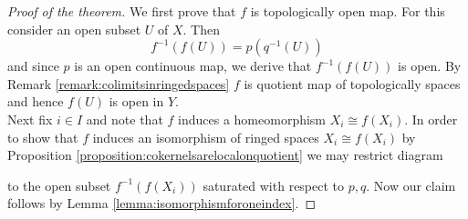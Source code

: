 \begin{proof}[Proof of the theorem]
We first prove that $f$ is topologically open map. For this consider an open subset $U$ of $X$. Then
$$f^{-1}(f(U)) = p(q^{-1}(U))$$
and since $p$ is an open continuous map, we derive that $f^{-1}(f(U))$ is open. By Remark \ref{remark:colimitsinringedspaces} $f$ is quotient map of topologically spaces and hence $f(U)$ is open in $Y$.\\
Next fix $i\in I$ and note that $f$ induces a homeomorphism $X_i\cong f(X_i)$. In order to show that $f$ induces an isomorphism of ringed spaces $X_i \cong f(X_i)$ by Proposition \ref{proposition:cokernelsarelocalonquotient} we may restrict diagram
\begin{center}
\end{center}
to the open subset $f^{-1}\left(f(X_i)\right)$ saturated with respect to $p, q$. Now our claim follows by Lemma \ref{lemma:isomorphismforoneindex}.
\end{proof}


\small



